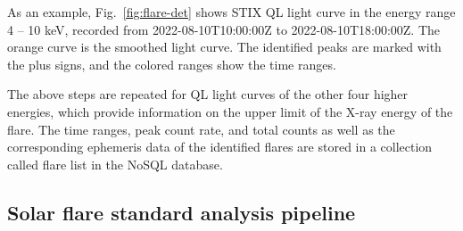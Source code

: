 \documentclass[referee]{preaa} %
\begin{document}
As an example, Fig.~\ref{fig:flare-det} shows STIX QL light curve in the energy range 4 -- 10 keV, recorded from 2022-08-10T10:00:00Z to 2022-08-10T18:00:00Z.  The orange curve is the smoothed light curve.  The identified peaks are marked with the plus signs, and the colored ranges show the time ranges.

The above steps are repeated for QL light curves of the other four higher energies, which provide information on the upper limit of the X-ray energy of the flare.
The time ranges, peak count rate, and total counts as well as the corresponding ephemeris data of the identified flares are  stored in a collection called flare list in the NoSQL database.


\subsection{Solar flare standard analysis pipeline}
\end{document}
